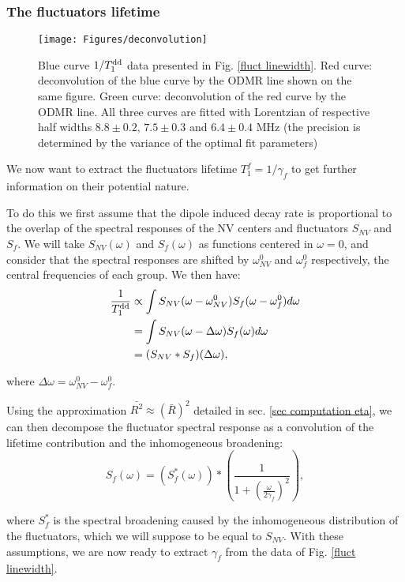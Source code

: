 \documentclass[a4paper,11pt]{report}
\begin{document}
\subsubsection{The fluctuators lifetime}
\begin{figure}[h]
\centering
\texttt{[image: Figures/deconvolution]}
\caption{Blue curve $1/T_1^{\rm dd}$ data presented in Fig. \ref{fluct linewidth}. Red curve: deconvolution of the blue curve by the ODMR line shown on the same figure. Green curve: deconvolution of the red curve   by the ODMR line. All three curves are fitted with Lorentzian of respective half widths $8.8 \pm 0.2$, $7.5 \pm 0.3$ and $6.4 \pm 0.4$ MHz (the precision is determined by the variance of the optimal fit parameters)}
\label{deconvolution}
\end{figure}

We now want to extract the fluctuators lifetime $T_1^f=1/\gamma_f$ to get further information on their potential nature. 

To do this we first assume that the dipole induced decay rate is proportional to the overlap of the spectral responses of the NV centers and fluctuators $S_{NV}$ and $S_f$. We will take $S_{NV}( \omega)$ and $S_{f}( \omega)$ as functions centered in $\omega=0$, and consider that the spectral responses are shifted by $\omega^0_{NV}$ and $\omega^0_{f}$ respectively, the central frequencies of each group. We then have:
\begin{align*}
\frac{1}{T_1^{\rm dd}} &\propto \int S_{NV} (\omega-\omega_{NV}^0) S_f (\omega-\omega_{f}^0) d\omega \\
&= \int S_{NV} (\omega-\Delta \omega) S_f (\omega)
 d\omega \\
 &= (S_{NV}*S_{f})(\Delta \omega),
\end{align*}

where $\Delta \omega=\omega_{NV}^0-\omega_{f}^0$.

Using the approximation $\bar {R ^2} \approx (\bar{R})^2$ detailed in sec. \ref{sec computation eta}, we can then decompose the fluctuator spectral response as a convolution of the lifetime contribution and the inhomogeneous broadening:
\begin{equation}
S_{f}(\omega)=\left(S_f^*(\omega)\right)*\left(\frac{1}{1+\left(\frac{\omega}{2 \gamma_f}\right)^2} \right),
\end{equation}

where $S_f^*$ is the spectral broadening caused by the inhomogeneous distribution of the fluctuators, which we will suppose to be equal to $S_{NV}$. With these assumptions, we are now ready to extract $\gamma_f$ from the data of Fig. \ref{fluct linewidth}.
\end{document}
